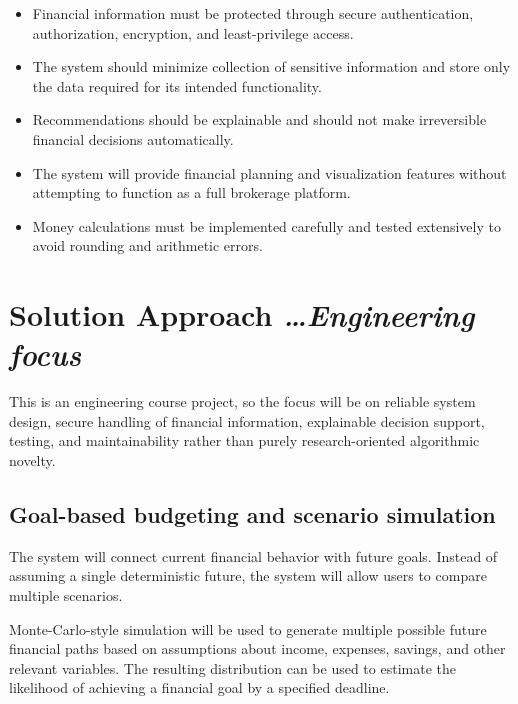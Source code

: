 \documentclass[11pt,a4paper]{article}
\newcommand{\BvrHint}[1]{%
  {\normalfont\normalsize\itshape\hfill #1}}
\begin{document}
\begin{itemize}[leftmargin=0.7cm]
    \item Financial information must be protected through secure authentication,
    authorization, encryption, and least-privilege access.
    
    \item The system should minimize collection of sensitive information and
    store only the data required for its intended functionality.
    
    \item Recommendations should be explainable and should not make
    irreversible financial decisions automatically.
    
    \item The system will provide financial planning and visualization features
    without attempting to function as a full brokerage platform.
    
    \item Money calculations must be implemented carefully and tested
    extensively to avoid rounding and arithmetic errors.
\end{itemize}


\section{Solution Approach%
  \BvrHint{\ldots Engineering focus}}

This is an engineering course project, so the focus will be on reliable system
design, secure handling of financial information, explainable decision
support, testing, and maintainability rather than purely research-oriented
algorithmic novelty.


\subsection{Goal-based budgeting and scenario simulation}

The system will connect current financial behavior with future goals. Instead
of assuming a single deterministic future, the system will allow users to
compare multiple scenarios.

Monte-Carlo-style simulation will be used to generate multiple possible future
financial paths based on assumptions about income, expenses, savings, and other
relevant variables. The resulting distribution can be used to estimate the
likelihood of achieving a financial goal by a specified deadline.
\end{document}
